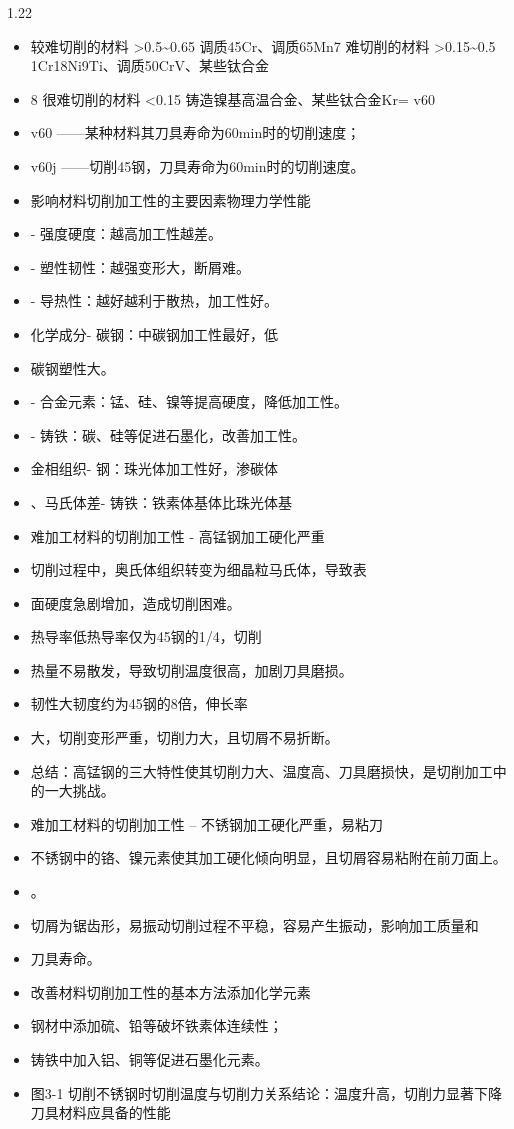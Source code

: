 \documentclass[12pt,a4paper]{article}
\begin{document}
\begin{spacing}{1.22}
\begin{itemize}[leftmargin=2.2em,label=--]
  \item 较难切削的材料 >0.5\textasciitilde{}0.65 调质45Cr、调质65Mn7 难切削的材料 >0.15\textasciitilde{}0.5 1Cr18Ni9Ti、调质50CrV、某些钛合金
  \item 8 很难切削的材料 <0.15 铸造镍基高温合金、某些钛合金Kr= v60
  \item v60 ——某种材料其刀具寿命为60min时的切削速度；
  \item v60j ——切削45钢，刀具寿命为60min时的切削速度。
  \item 影响材料切削加工性的主要因素物理力学性能
  \item - 强度硬度：越高加工性越差。
  \item - 塑性韧性：越强变形大，断屑难。
  \item - 导热性：越好越利于散热，加工性好。
  \item 化学成分- 碳钢：中碳钢加工性最好，低
  \item 碳钢塑性大。
  \item - 合金元素：锰、硅、镍等提高硬度，降低加工性。
  \item - 铸铁：碳、硅等促进石墨化，改善加工性。
  \item 金相组织- 钢：珠光体加工性好，渗碳体
  \item 、马氏体差- 铸铁：铁素体基体比珠光体基
  \item 难加工材料的切削加工性 - 高锰钢加工硬化严重
  \item 切削过程中，奥氏体组织转变为细晶粒马氏体，导致表
  \item 面硬度急剧增加，造成切削困难。
  \item 热导率低热导率仅为45钢的1/4，切削
  \item 热量不易散发，导致切削温度很高，加剧刀具磨损。
  \item 韧性大韧度约为45钢的8倍，伸长率
  \item 大，切削变形严重，切削力大，且切屑不易折断。
  \item 总结：高锰钢的三大特性使其切削力大、温度高、刀具磨损快，是切削加工中的一大挑战。
  \item 难加工材料的切削加工性 – 不锈钢加工硬化严重，易粘刀
  \item 不锈钢中的铬、镍元素使其加工硬化倾向明显，且切屑容易粘附在前刀面上。
  \item 。
  \item 切屑为锯齿形，易振动切削过程不平稳，容易产生振动，影响加工质量和
  \item 刀具寿命。
  \item 改善材料切削加工性的基本方法添加化学元素
  \item 钢材中添加硫、铅等破坏铁素体连续性；
  \item 铸铁中加入铝、铜等促进石墨化元素。
  \item 图3-1 切削不锈钢时切削温度与切削力关系结论：温度升高，切削力显著下降刀具材料应具备的性能
\end{itemize}


\end{spacing}
\end{document}

